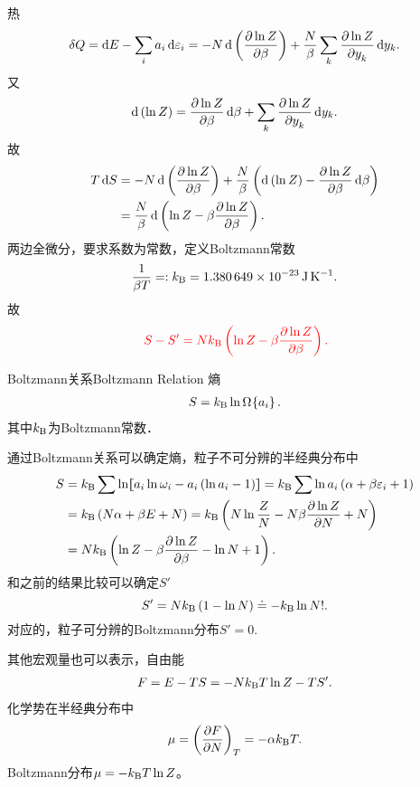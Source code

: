 热
\[
	\delta Q=\d E-\sum_ia_i\d\varepsilon_i=-N\d\kh{\pv{\ln Z}\beta}+\frac N\beta\sum_k\pv{\ln Z}{y_k}\d y_k.
\]
又
\[
	\d\kh{\ln Z}=\pv{\ln Z}\beta\d\beta+\sum_k\pv{\ln Z}{y_k}\d y_k.
\]
故
\begin{align*}
	T\d S & =-N\d\kh{\pv{\ln Z}\beta}+\frac N\beta\kh{\d\kh{\ln Z}-\pv{\ln Z}\beta\d\beta} \\
	      & =\frac N\beta\d\kh{\ln Z-\beta\pv{\ln Z}\beta}.
\end{align*}
两边全微分，要求系数为常数，定义Boltzmann常数
\[
	\frac1{\beta T}=:\kB=\SI{1.380649e-23}{\J\per\K}.
\]
故
\begin{align}
	\;\textcolor{red}{S-S'=Nk_{\mathrm B}\left(\ln Z-\beta\frac{\partial^{\;\!\!}\ln Z}{\partial \beta^{\;\!\!}}\right).}
\end{align}
\begin{theorem}{Boltzmann关系}{Boltzmann Relation}
	熵
	\begin{align}
		S=k_{\mathrm B}\ln\Omega_{\mathrm{\,\!}}\!\left\{a_i\right\}.
	\end{align}
	其中$k_{\mathrm B}$为Boltzmann常数．
\end{theorem}
通过Boltzmann关系可以确定熵，粒子不可分辨的半经典分布中
\begin{align}\notag
	S & =\kB\sum\ln\zkh{a_i\ln\omega_i-a_i\kh{\ln a_i-1}}=\kB\sum\ln a_i\kh{\alpha+\beta\varepsilon_i+1} \\\notag
	  & =\kB\kh{N\alpha+\beta E+N}=\kB\kh{N\ln\frac ZN-N\beta\pv{\ln Z}N+N}                              \\
	  & =N\kB\kh{\ln Z-\beta\pv{\ln Z}\beta-\ln N+1}.
\end{align}
和之前的结果比较可以确定$S'$
\[
	S'=Nk_{\mathrm B}\left(1-\ln N\right)\doteq-k_{\mathrm B}\ln N!.
\]
对应的，粒子可分辨的Boltzmann分布$S'=0.$

其他宏观量也可以表示，自由能
\begin{align}
	F=E-TS=-Nk_{\mathrm B} T\ln Z-TS'.
\end{align}
化学势在半经典分布中
\[
	\mu=\left(\frac{\partial^{\;\!\!}F}{\partial N^{\;\!\!}}\right)_T=-\alpha k_{\mathrm B} T.
\]
Boltzmann分布$\mu=-k_{\mathrm B} T\ln Z$。

